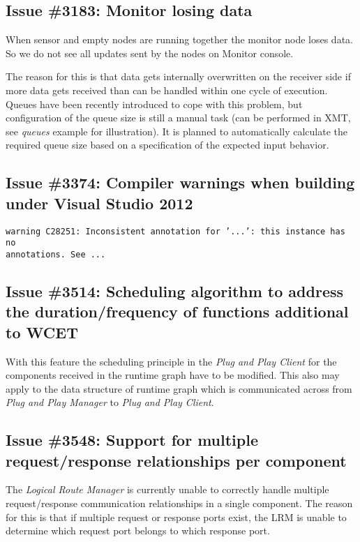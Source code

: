 \subsection{Issue \#3183: Monitor losing data}

When sensor and empty nodes are running together the monitor node loses data. So we do not see all updates sent by the nodes on Monitor console.

The reason for this is that data gets internally overwritten on the receiver side if more data gets received than can be handled within one cycle of execution.
Queues have been recently introduced to cope with this problem, but configuration of the queue size is still a manual task
(can be performed in XMT, see \emph{queues} example for illustration).
It is planned to automatically calculate the required queue size based on a specification of the expected input behavior.

\subsection{Issue \#3374: Compiler warnings when building under Visual Studio 2012}

\texttt{warning C28251: Inconsistent annotation for '...': this instance has no\\
annotations. See ...}

\subsection{Issue \#3514: Scheduling algorithm to address the duration/frequency of functions additional to WCET}

With this feature the scheduling principle in the \emph{Plug and Play Client} for the components received in the runtime graph have to be modified.
This also may apply to the data structure of runtime graph which is communicated across from \emph{Plug and Play Manager} to \emph{Plug and Play Client}.

\subsection{Issue \#3548: Support for multiple request/response relationships per component}

The \emph{Logical Route Manager} is currently unable to correctly handle multiple request/response communication relationships in a single component.
The reason for this is that if multiple request or response ports exist, the LRM is unable to determine which request port belongs to which response port.

